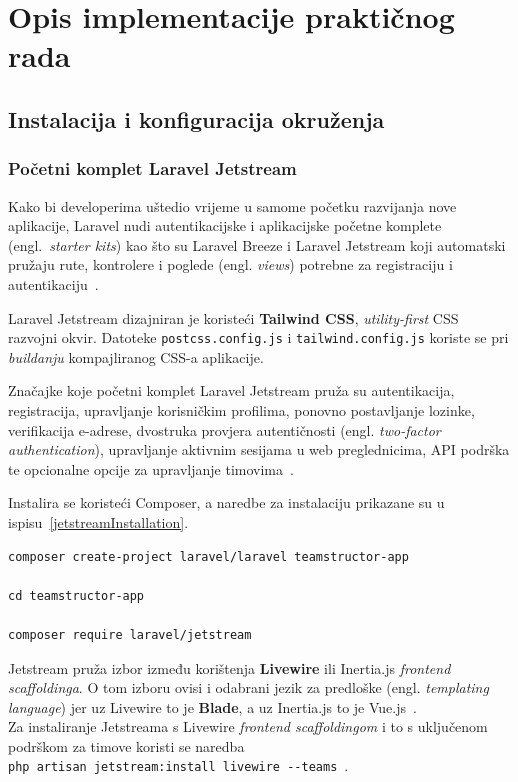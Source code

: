 \section{Opis implementacije praktičnog rada}

\subsection{Instalacija i konfiguracija okruženja}

\subsubsection{Početni komplet Laravel Jetstream}
Kako bi developerima uštedio vrijeme u samome početku razvijanja nove aplikacije, Laravel nudi autentikacijske i aplikacijske početne komplete (engl.~\textit{starter kits}) kao što su Laravel Breeze i Laravel Jetstream koji automatski pružaju rute, kontrolere i poglede (engl. \textit{views}) potrebne za registraciju i autentikaciju~\cite{starterKits}.

Laravel Jetstream dizajniran je koristeći \textbf{Tailwind CSS}, \textit{utility-first} CSS razvojni okvir. Datoteke \texttt{postcss.config.js} i \texttt{tailwind.config.js} koriste se pri \textit{buildanju} kompajliranog CSS-a aplikacije.

Značajke koje početni komplet Laravel Jetstream pruža su autentikacija, registracija, upravljanje korisničkim profilima, ponovno postavljanje lozinke, verifikacija e-adrese, dvostruka provjera autentičnosti (engl. \textit{two-factor authentication}), upravljanje aktivnim sesijama u web preglednicima, API podrška te opcionalne opcije za upravljanje timovima~\cite{jetstreamIntro}.

Instalira se koristeći Composer, a naredbe za instalaciju prikazane su u ispisu~\ref{jetstreamInstallation}.

\begin{lstlisting}[caption={Naredbe za instalaciju Jetstream paketa u novi Laravel projekt}, label=jetstreamInstallation]
composer create-project laravel/laravel teamstructor-app

cd teamstructor-app

composer require laravel/jetstream
\end{lstlisting}

Jetstream pruža izbor između korištenja \textbf{Livewire} ili Inertia.js \textit{frontend scaffoldinga}. O tom izboru ovisi i odabrani jezik za predloške (engl. \textit{templating language}) jer uz Livewire to je \textbf{Blade}, a uz Inertia.js to je Vue.js~\cite{jetstreamIntro}. \\ Za instaliranje Jetstreama s Livewire \textit{frontend scaffoldingom} i to s uključenom podrškom za timove koristi se naredba \\ \texttt{php artisan jetstream:install livewire -{}-teams}~\cite{jetstreamInstallation}.

